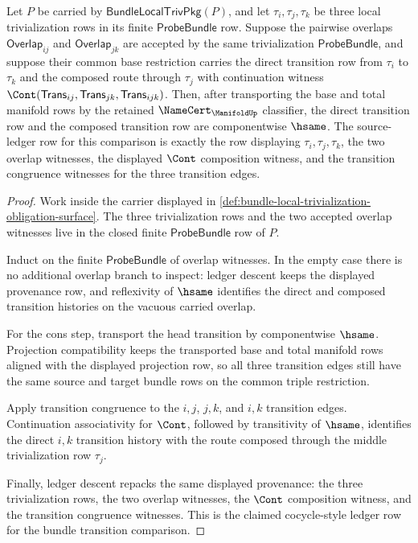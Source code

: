 \begin{theorem}
\label{thm:bundle-transition-cocycle-ledger-closure}
Let $P$ be carried by $\mathsf{BundleLocalTrivPkg}(P)$, and let
$\tau_i,\tau_j,\tau_k$ be three local trivialization rows in its finite
$\mathsf{ProbeBundle}$ row. Suppose the pairwise overlaps
$\mathsf{Overlap}_{ij}$ and $\mathsf{Overlap}_{jk}$ are accepted by the same
trivialization $\mathsf{ProbeBundle}$, and suppose their common base
restriction carries the direct transition row from $\tau_i$ to $\tau_k$ and
the composed route through $\tau_j$ with continuation witness
$\Cont(\mathsf{Trans}_{ij},\mathsf{Trans}_{jk},\mathsf{Trans}_{ijk})$. Then,
after transporting the base and total manifold rows by the retained
$\NameCert_{\ManifoldUp}$ classifier, the direct transition row and the
composed transition row are componentwise $\hsame$. The source-ledger row for
this comparison is exactly the row displaying
$\tau_i,\tau_j,\tau_k$, the two overlap witnesses, the displayed $\Cont$
composition witness, and the transition congruence witnesses for the three
transition edges.
\end{theorem}
\begin{proof}
Work inside the carrier displayed in
\autoref{def:bundle-local-trivialization-obligation-surface}. The three
trivialization rows and the two accepted overlap witnesses live in the closed
finite $\mathsf{ProbeBundle}$ row of $P$.

Induct on the finite $\mathsf{ProbeBundle}$ of overlap witnesses. In the empty
case there is no additional overlap branch to inspect: ledger descent keeps
the displayed provenance row, and reflexivity of $\hsame$ identifies the
direct and composed transition histories on the vacuous carried overlap.

For the cons step, transport the head transition by componentwise $\hsame$.
Projection compatibility keeps the transported base and total manifold rows
aligned with the displayed projection row, so all three transition edges still
have the same source and target bundle rows on the common triple restriction.

Apply transition congruence to the $i,j$, $j,k$, and $i,k$ transition edges.
Continuation associativity for $\Cont$, followed by transitivity of $\hsame$,
identifies the direct $i,k$ transition history with the route composed through
the middle trivialization row $\tau_j$.

Finally, ledger descent repacks the same displayed provenance: the three
trivialization rows, the two overlap witnesses, the $\Cont$ composition
witness, and the transition congruence witnesses. This is the claimed
cocycle-style ledger row for the bundle transition comparison.
\end{proof}

